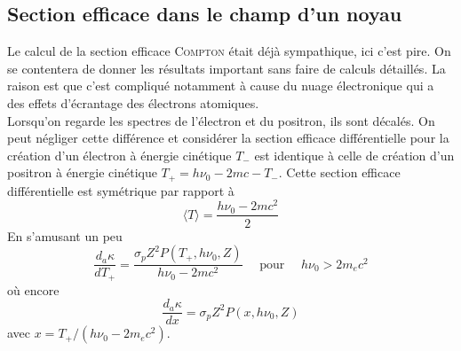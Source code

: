 \subsection{Section efficace dans le champ d'un noyau}%
Le calcul de la section efficace \textsc{Compton} était déjà sympathique, ici c'est pire. On se
contentera de donner les résultats important sans faire de calculs détaillés. La raison est que 
c'est compliqué notamment à cause du nuage électronique qui a des effets d'écrantage des électrons
atomiques. \\

Lorsqu'on regarde les spectres de l'électron et du positron, ils sont décalés. On peut négliger cette
différence et considérer la section efficace différentielle pour la création d'un électron à énergie
cinétique $T_-$ est identique à celle de création d'un positron à énergie cinétique $T_+=h\nu_0-2mc-
T_-$. Cette section efficace différentielle est symétrique par rapport à 
\begin{equation}
\langle T \rangle = \frac{h\nu_{0}-2mc^2}{2}
\end{equation}
En s'amusant un peu
\begin{equation}
\frac{d{}_a\kappa}{dT_+}=\frac{\sigma_pZ^2P(T_+,h\nu_0,Z)}{h\nu_0-2mc^2}{\mbox{~~~~pour~~~~}}h\nu_0>2m_ec^2
\end{equation}
où encore
\begin{equation}
\frac{d{}_a\kappa}{dx}=\sigma_pZ^2P(x,h\nu_0,Z)
\end{equation}
avec $x = T_+/(h\nu_0-2m_ec^2)$.\\


